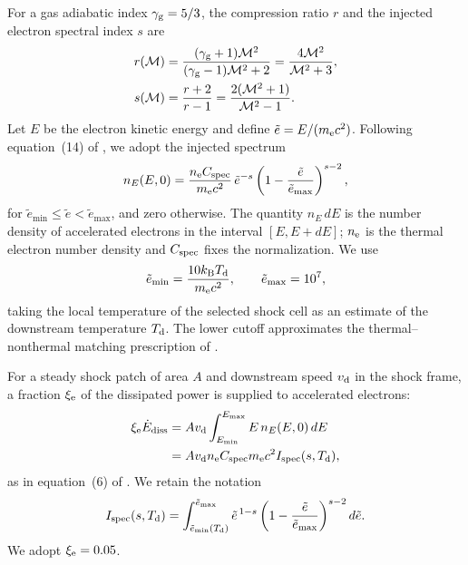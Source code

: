 For a gas adiabatic index $\gamma_{\rm g}=5/3$, the compression
ratio $r$ and the injected electron spectral index $s$ are
\begin{equation}
\begin{aligned}
r(\mathcal{M}) &=
\frac{(\gamma_{\rm g}+1)\mathcal{M}^{2}}
     {(\gamma_{\rm g}-1)\mathcal{M}^{2}+2} = \frac{4\mathcal{M}^{2}}{\mathcal{M}^{2}+3},\\
s(\mathcal{M}) &= \frac{r+2}{r-1}
=\frac{2(\mathcal{M}^{2}+1)}{\mathcal{M}^{2}-1}.
\end{aligned}
\label{eq:radio_shock_slope}
\end{equation}
Let $E$ be the electron kinetic energy and define
$\tilde e=E/(m_{\rm e}c^{2})$. Following equation~(14) of
\citet{HoeftBruggen2007}, we adopt the injected spectrum
\begin{equation}
n_E(E,0)=
\frac{n_{\rm e}C_{\rm spec}}{m_{\rm e}c^{2}}\,
\tilde e^{-s}
\left(1-\frac{\tilde e}{\tilde e_{\max}}\right)^{s-2},
\label{eq:radio_injected_spectrum}
\end{equation}
for $\tilde e_{\min}\leq\tilde e<\tilde e_{\max}$, and zero
otherwise. The quantity $n_E\,dE$ is the number density of
accelerated electrons in the interval $[E,E+dE]$;
$n_{\rm e}$ is the thermal electron number density and
$C_{\rm spec}$ fixes the normalization. We use
\begin{equation}
\tilde e_{\min}=\frac{10k_{\rm B}T_{\rm d}}{m_{\rm e}c^{2}},
\qquad
\tilde e_{\max}=10^{7},
\label{eq:radio_energy_cutoffs}
\end{equation}
taking the local temperature of the selected shock cell as an
estimate of the downstream temperature $T_{\rm d}$.
The lower cutoff approximates the thermal--nonthermal matching
prescription of \citet{HoeftBruggen2007}. 

For a steady shock patch of area $A$ and downstream speed $v_{\rm d}$
in the shock frame, a fraction $\xi_{\rm e}$ of the dissipated power
is supplied to accelerated electrons:
\begin{equation}
\begin{aligned}
\xi_{\rm e}\dot{E}_{\rm diss}
&= A v_{\rm d}\int_{E_{\min}}^{E_{\max}}
E\,n_E(E,0)\,dE\\
&= A v_{\rm d}n_{\rm e}C_{\rm spec}m_{\rm e}c^{2}
I_{\rm spec}(s,T_{\rm d}),
\end{aligned}
\label{eq:radio_energy_budget}
\end{equation}
as in equation~(6) of \citet{Lee2024}. We retain the
\citet{HoeftBruggen2007} notation
\begin{equation}
I_{\rm spec}(s,T_{\rm d})=
\int_{\tilde e_{\min}(T_{\rm d})}^{\tilde e_{\max}}
\tilde e^{\,1-s}
\left(1-\frac{\tilde e}{\tilde e_{\max}}\right)^{s-2}
d\tilde e .
\label{eq:radio_ispec}
\end{equation}
We adopt $\xi_{\rm e}=0.05$.

